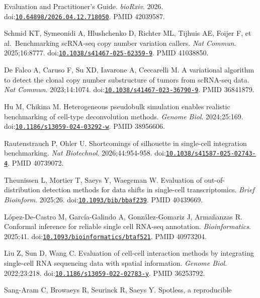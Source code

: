 \documentclass[11pt]{article}
\begin{document}
\begin{enumerate}[label={[\arabic*]},leftmargin=2.6em,labelsep=0.5em,itemsep=1.5pt]
  Evaluation and Practitioner's Guide. \emph{bioRxiv}. 2026.
  doi:\href{https://doi.org/10.64898/2026.04.12.718050}{\nolinkurl{10.64898/2026.04.12.718050}}.
  PMID 42039587.
\item
  Schmid KT, Symeonidi A, Hlushchenko D, Richter ML, Tijhuis AE, Foijer
  F, et al.~Benchmarking scRNA-seq copy number variation callers.
  \emph{Nat Commun}. 2025;16:8777.
  doi:\href{https://doi.org/10.1038/s41467-025-62359-9}{\nolinkurl{10.1038/s41467-025-62359-9}}.
  PMID 41038850.
\item
  De Falco A, Caruso F, Su XD, Iavarone A, Ceccarelli M. A variational
  algorithm to detect the clonal copy number substructure of tumors from
  scRNA-seq data. \emph{Nat Commun}. 2023;14:1074.
  doi:\href{https://doi.org/10.1038/s41467-023-36790-9}{\nolinkurl{10.1038/s41467-023-36790-9}}.
  PMID 36841879.
\item
  Hu M, Chikina M. Heterogeneous pseudobulk simulation enables realistic
  benchmarking of cell-type deconvolution methods. \emph{Genome Biol}.
  2024;25:169.
  doi:\href{https://doi.org/10.1186/s13059-024-03292-w}{\nolinkurl{10.1186/s13059-024-03292-w}}.
  PMID 38956606.
\item
  Rautenstrauch P, Ohler U. Shortcomings of silhouette in single-cell
  integration benchmarking. \emph{Nat Biotechnol}. 2026;44:954-958.
  doi:\href{https://doi.org/10.1038/s41587-025-02743-4}{\nolinkurl{10.1038/s41587-025-02743-4}}.
  PMID 40739072.
\item
  Theunissen L, Mortier T, Saeys Y, Waegeman W. Evaluation of
  out-of-distribution detection methods for data shifts in single-cell
  transcriptomics. \emph{Brief Bioinform}. 2025;26.
  doi:\href{https://doi.org/10.1093/bib/bbaf239}{\nolinkurl{10.1093/bib/bbaf239}}.
  PMID 40439669.
\item
  López-De-Castro M, García-Galindo A, González-Gomariz J, Armañanzas R.
  Conformal inference for reliable single cell RNA-seq annotation.
  \emph{Bioinformatics}. 2025;41.
  doi:\href{https://doi.org/10.1093/bioinformatics/btaf521}{\nolinkurl{10.1093/bioinformatics/btaf521}}.
  PMID 40973204.
\item
  Liu Z, Sun D, Wang C. Evaluation of cell-cell interaction methods by
  integrating single-cell RNA sequencing data with spatial information.
  \emph{Genome Biol}. 2022;23:218.
  doi:\href{https://doi.org/10.1186/s13059-022-02783-y}{\nolinkurl{10.1186/s13059-022-02783-y}}.
  PMID 36253792.
\item
  Sang-Aram C, Browaeys R, Seurinck R, Saeys Y. Spotless, a reproducible

\end{enumerate}
\end{document}
